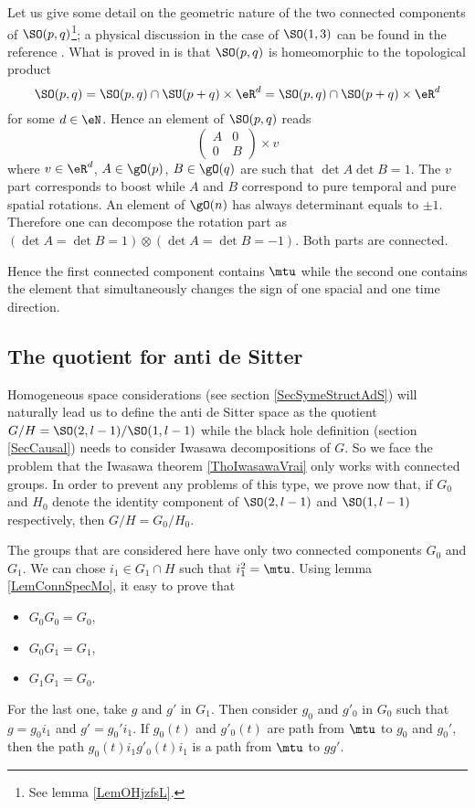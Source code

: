 \label{PgDisGeoConnSO}Let us give some detail on the geometric nature of the two connected components of $\SO(p,q)$\footnote{See lemma \ref{LemOHjzfsL}.}; a physical discussion in the case of $\SO(1,3)$ can be found in the reference \cite{Schomblond_em}. What is proved in \cite{HelgasonSym} is that $\SO(p,q)$ is homeomorphic to the topological product
\[ 
  \SO(p,q)=\SO(p,q)\cap\SU(p+q)\times \eR^{d}=\SO(p,q)\cap\SO(p+q)\times \eR^{d}
\]
for some $d\in\eN$. Hence an element of $\SO(p,q)$ reads
\[ 
  \begin{pmatrix}
A&0\\
0&B
\end{pmatrix}\times v
\]
where $v\in\eR^{d}$, $A\in \gO(p)$, $B\in\gO(q)$ are such that $\det A\det B=1$. The $v$ part corresponds to boost while $A$ and $B$ correspond to pure temporal and pure spatial rotations. An element of $\gO(n)$ has always determinant equals to $\pm 1$. Therefore one can decompose the rotation part as $(\det A=\det B=1)\otimes (\det A=\det B=-1)$. Both parts are connected.

Hence the first connected component contains $\mtu$ while the second one contains the element that simultaneously changes the sign of one spacial and one time direction.

\subsection{The quotient for anti de Sitter}

Homogeneous space considerations (see section \ref{SecSymeStructAdS}) will naturally lead us to define the anti de Sitter space as the quotient $G/H=\SO(2,l-1)/\SO(1,l-1)$ while the black hole definition (section \ref{SecCausal}) needs to consider Iwasawa decompositions of $G$. So we face the problem that the Iwasawa theorem \ref{ThoIwasawaVrai} only works with connected groups. In order to prevent any problems of this type, we prove now that, if $G_0$ and $H_0$ denote the identity component of $\SO(2,l-1)$ and $\SO(1,l-1)$ respectively, then $G/H=G_0/H_0$.

The groups that are considered here have only two connected components $G_0$ and $G_1$. We can chose $i_1\in G_1\cap H$ such that $i_1^2=\mtu$. Using lemma \ref{LemConnSpecMo}, it easy to prove that 
\begin{itemize}
\item $G_0G_0=G_0$,
\item $G_0G_1=G_1$,
\item $G_1G_1=G_0$.
\end{itemize}
For the last one, take $g$ and $g'$ in $G_1$. Then consider $g_0$ and $g'_0$ in $G_0$ such that $g=g_0i_1$ and $g'=g_0'i_1$. If $g_0(t)$ and $g'_0(t)$ are path from $\mtu$ to $g_0$ and $g_0'$, then the path $g_0(t)i_1g'_0(t)i_1$ is a path from $\mtu$ to $gg'$.

